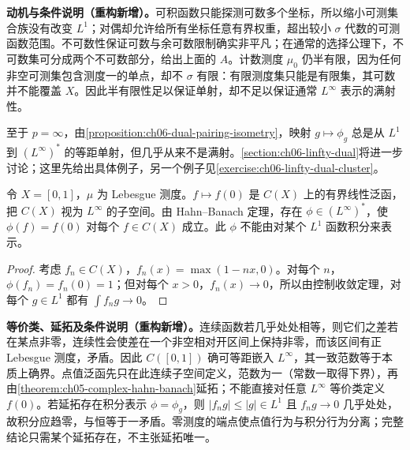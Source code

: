 \documentclass[../../main.tex]{subfiles}
\begin{document}
\begin{remark}
\textbf{动机与条件说明（重构新增）。}可积函数只能探测可数多个坐标，所以缩小可测集合族没有改变 $L^1$；对偶却允许给所有坐标任意有界权重，超出较小 $\sigma$ 代数的可测函数范围。不可数性保证可数与余可数限制确实非平凡；在通常的选择公理下，不可数集可分成两个不可数部分，给出上面的 $A$。计数测度 $\mu_0$ 仍半有限，因为任何非空可测集包含测度一的单点，却不 $\sigma$ 有限：有限测度集只能是有限集，其可数并不能覆盖 $X$。因此半有限性足以保证单射，却不足以保证通常 $L^\infty$ 表示的满射性。
\end{remark}
至于 $p=\infty$，由\cref{proposition:ch06-dual-pairing-isometry}，映射 $g\mapsto\phi_g$ 总是从 $L^1$ 到 $(L^\infty)^*$ 的等距单射，但几乎从来不是满射。\cref{section:ch06-linfty-dual}将进一步讨论；这里先给出具体例子，另一个例子见\cref{exercise:ch06-linfty-dual-cluster}。
\begin{example}\label{example:ch06-linfty-point-evaluation}
令 $X=[0,1]$，$\mu$ 为 Lebesgue 测度。$f\mapsto f(0)$ 是 $C(X)$ 上的有界线性泛函，把 $C(X)$ 视为 $L^\infty$ 的子空间。由 Hahn–Banach 定理，存在 $\phi\in(L^\infty)^*$，使 $\phi(f)=f(0)$ 对每个 $f\in C(X)$ 成立。此 $\phi$ 不能由对某个 $L^1$ 函数积分来表示。
\end{example}
\begin{proof}
考虑 $f_n\in C(X)$，$f_n(x)=\max(1-nx,0)$。对每个 $n$，$\phi(f_n)=f_n(0)=1$；但对每个 $x>0$，$f_n(x)\to0$，所以由控制收敛定理，对每个 $g\in L^1$ 都有 $\int f_ng\to0$。
\end{proof}
\begin{remark}
\textbf{等价类、延拓及条件说明（重构新增）。}连续函数若几乎处处相等，则它们之差若在某点非零，连续性会使差在一个非空相对开区间上保持非零，而该区间有正 Lebesgue 测度，矛盾。因此 $C([0,1])$ 确可等距嵌入 $L^\infty$，其一致范数等于本质上确界。点值泛函先只在此连续子空间定义，范数为一（常数一取得下界），再由\cref{theorem:ch05-complex-hahn-banach}延拓；不能直接对任意 $L^\infty$ 等价类定义 $f(0)$。若延拓存在积分表示 $\phi=\phi_g$，则 $|f_ng|\leqslant|g|\in L^1$ 且 $f_ng\to0$ 几乎处处，故积分应趋零，与恒等于一矛盾。零测度的端点使点值行为与积分行为分离；完整结论只需某个延拓存在，不主张延拓唯一。
\end{remark}

\end{document}
